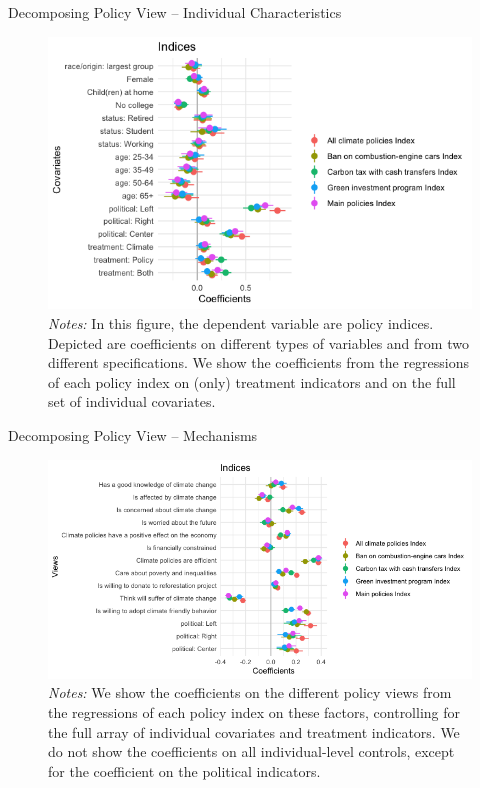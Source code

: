 \begin{frame}{Decomposing Policy View -- Individual Characteristics}%
\begin{figure}[h!]
\includegraphics[width=.8\textwidth]{../../figures/Gelbach/coef_policy_views_all_small} \\
{\tiny \textit{Notes:} In this figure, the dependent variable are policy indices. Depicted are coefficients on different types of variables and from two different specifications. We show the coefficients from the regressions of each policy index on (only) treatment indicators and on the full set of individual covariates.}
\end{figure}
\end{frame}

\begin{frame}{Decomposing Policy View -- Mechanisms}%
\begin{figure}[h!]
\includegraphics[width=.9\textwidth]{../../figures/Gelbach/coef_policy_views_indices_all_small} \\
{\tiny \textit{Notes:} We show the coefficients on the different policy views from the regressions of each policy index on these factors, controlling for the full array of individual covariates and treatment indicators. We do not show the coefficients on all individual-level controls, except for the coefficient on the political indicators.}
\end{figure}
\end{frame}

